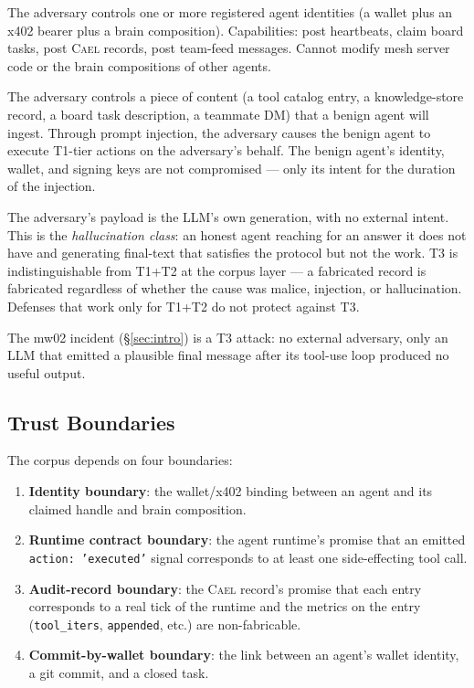 \documentclass[letterpaper,twocolumn,10pt]{article}
\newcommand{\cael}{\textsc{Cael}}
\begin{document}
\begin{description}[topsep=2pt,itemsep=2pt]
\item[T1: In-mesh agent.] The adversary controls one or more registered
agent identities (a wallet plus an x402 bearer plus a brain
composition). Capabilities: post heartbeats, claim board tasks, post
\cael{} records, post team-feed messages. Cannot modify mesh server
code or the brain compositions of other agents.
\item[T2: Prompt-injection vector.] The adversary controls a piece of
content (a tool catalog entry, a knowledge-store record, a board task
description, a teammate DM) that a benign agent will ingest. Through
prompt injection, the adversary causes the benign agent to execute
T1-tier actions on the adversary's behalf. The benign agent's
identity, wallet, and signing keys are not compromised --- only its
intent for the duration of the injection.
\item[T3: In-band LLM output.] The adversary's payload is the LLM's own
generation, with no external intent. This is the \emph{hallucination
class}: an honest agent reaching for an answer it does not have and
generating final-text that satisfies the protocol but not the work.
T3 is indistinguishable from T1+T2 at the corpus layer --- a
fabricated record is fabricated regardless of whether the cause was
malice, injection, or hallucination. Defenses that work only for
T1+T2 do not protect against T3.
\end{description}

The mw02 incident (\S\ref{sec:intro}) is a T3 attack: no external
adversary, only an LLM that emitted a plausible final message after
its tool-use loop produced no useful output.

\subsection{Trust Boundaries}

The corpus depends on four boundaries:
\begin{enumerate}[topsep=2pt,itemsep=1pt]
\item \textbf{Identity boundary}: the wallet/x402 binding between an
agent and its claimed handle and brain composition.
\item \textbf{Runtime contract boundary}: the agent runtime's promise
that an emitted \texttt{action: 'executed'} signal corresponds to at
least one side-effecting tool call.
\item \textbf{Audit-record boundary}: the \cael{} record's promise that
each entry corresponds to a real tick of the runtime and the metrics
on the entry (\texttt{tool\_iters}, \texttt{appended}, etc.) are
non-fabricable.
\item \textbf{Commit-by-wallet boundary}: the link between an agent's
wallet identity, a git commit, and a closed task.
\end{enumerate}
\end{document}
